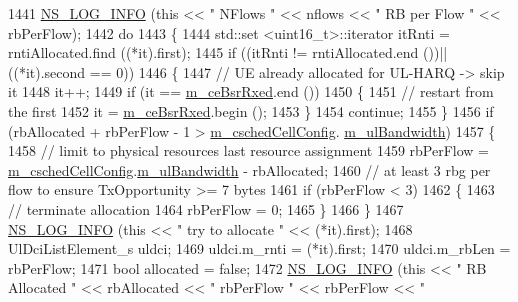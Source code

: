 \begin{DoxyCode}
1441   \hyperlink{group__logging_gafbd73ee2cf9f26b319f49086d8e860fb}{NS\_LOG\_INFO} (\textcolor{keyword}{this} << \textcolor{stringliteral}{" NFlows "} << nflows << \textcolor{stringliteral}{" RB per Flow "} << rbPerFlow);
1442   \textcolor{keywordflow}{do}
1443     \{
1444       std::set <uint16\_t>::iterator itRnti = rntiAllocated.find ((*it).first);
1445       \textcolor{keywordflow}{if} ((itRnti != rntiAllocated.end ())||((*it).second == 0))
1446         \{
1447           \textcolor{comment}{// UE already allocated for UL-HARQ -> skip it}
1448           it++;
1449           \textcolor{keywordflow}{if} (it == \hyperlink{classns3_1_1RrFfMacScheduler_a1696bc07e1fdc0336106223f97b44298}{m\_ceBsrRxed}.end ())
1450             \{
1451               \textcolor{comment}{// restart from the first}
1452               it = \hyperlink{classns3_1_1RrFfMacScheduler_a1696bc07e1fdc0336106223f97b44298}{m\_ceBsrRxed}.begin ();
1453             \}
1454           \textcolor{keywordflow}{continue};
1455         \}
1456       \textcolor{keywordflow}{if} (rbAllocated + rbPerFlow - 1 > \hyperlink{classns3_1_1RrFfMacScheduler_a809c6237863709f97fc450b1a2ba60d4}{m\_cschedCellConfig}.
      \hyperlink{structns3_1_1FfMacCschedSapProvider_1_1CschedCellConfigReqParameters_a5ab5b102878e6e7e7727a14af4a64d2f}{m\_ulBandwidth})
1457         \{
1458           \textcolor{comment}{// limit to physical resources last resource assignment}
1459           rbPerFlow = \hyperlink{classns3_1_1RrFfMacScheduler_a809c6237863709f97fc450b1a2ba60d4}{m\_cschedCellConfig}.\hyperlink{structns3_1_1FfMacCschedSapProvider_1_1CschedCellConfigReqParameters_a5ab5b102878e6e7e7727a14af4a64d2f}{m\_ulBandwidth} - rbAllocated;
1460           \textcolor{comment}{// at least 3 rbg per flow to ensure TxOpportunity >= 7 bytes}
1461           \textcolor{keywordflow}{if} (rbPerFlow < 3)
1462             \{
1463               \textcolor{comment}{// terminate allocation}
1464               rbPerFlow = 0;      
1465             \}
1466         \}
1467       \hyperlink{group__logging_gafbd73ee2cf9f26b319f49086d8e860fb}{NS\_LOG\_INFO} (\textcolor{keyword}{this} << \textcolor{stringliteral}{" try to allocate "} << (*it).first);
1468       UlDciListElement\_s uldci;
1469       uldci.m\_rnti = (*it).first;
1470       uldci.m\_rbLen = rbPerFlow;
1471       \textcolor{keywordtype}{bool} allocated = \textcolor{keyword}{false};
1472       \hyperlink{group__logging_gafbd73ee2cf9f26b319f49086d8e860fb}{NS\_LOG\_INFO} (\textcolor{keyword}{this} << \textcolor{stringliteral}{" RB Allocated "} << rbAllocated << \textcolor{stringliteral}{" rbPerFlow "} << rbPerFlow << \textcolor{stringliteral}{"
}
\end{DoxyCode}
